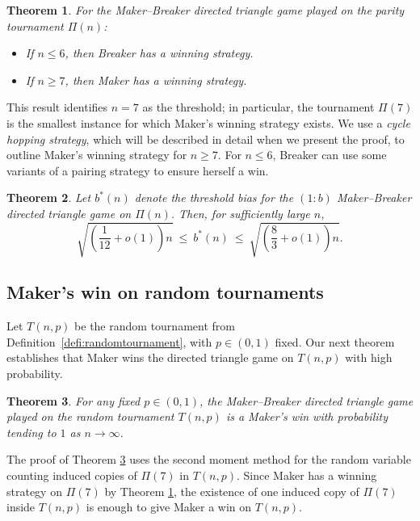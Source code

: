 \documentclass{article}
\theoremstyle{definition}
\theoremstyle{plain}
\newtheorem{theo}{Theorem}[section]
\theoremstyle{remark}
\theoremstyle{definition}
\begin{document}
\begin{theo}\label{thm:thresholdunbiased}
For the Maker–Breaker directed triangle game played on the parity tournament $\Pi(n)$:
\begin{itemize}
    \item If $n\le 6$, then Breaker has a winning strategy.
    \item If $n \ge 7$, then Maker has a winning strategy.
\end{itemize}
\end{theo}

This result identifies $n=7$ as the threshold; in particular, the tournament $\Pi(7)$ is the smallest instance for which Maker's winning strategy exists. We use a \emph{cycle hopping strategy}, which will be described in detail when we present the proof, to outline Maker's winning strategy for $n\ge7$. For $n \le 6$, Breaker can use some variants of a pairing strategy to ensure herself a win.

\begin{theo}\label{thm:bias-threshold}
Let $b^*(n)$ denote the threshold bias for the $(1:b)$ Maker–Breaker directed triangle game on $\Pi(n)$. Then, for sufficiently large $n$, 
\begin{equation} \label{eqn:bias threshold inequality}
    \sqrt{\left(\frac{1}{12} + o(1)\right)n} \ \le\  b^*(n) \ \le\  \sqrt{\left(\frac{8}{3} + o(1)\right)n}.
\end{equation}

\end{theo}


\subsection{Maker's win on random tournaments}\label{subsec:randomtournament}

Let $T(n,p)$ be the random tournament from Definition~\ref{defi:randomtournament}, with $p\in(0,1)$ fixed.
Our next theorem establishes that Maker wins the directed triangle game on $T(n,p)$ with high probability.

\begin{theo}\label{thm:random}
For any fixed $p\in (0,1)$, the Maker–Breaker directed triangle game played on the random tournament $T(n,p)$ is a Maker's win with probability tending to $1$ as $n\to\infty$.
\end{theo}

The proof of Theorem \ref{thm:random} uses the second moment method for the random variable counting induced copies of $\Pi(7)$ in $T(n,p)$. Since Maker has a winning strategy on $\Pi(7)$ by Theorem \ref{thm:thresholdunbiased}, the existence of one induced copy of $\Pi(7)$ inside $T(n,p)$ is enough to give Maker a win on $T(n,p)$.
\end{document}
